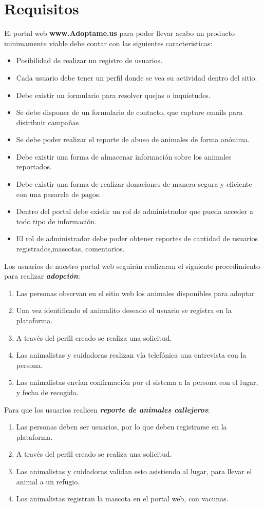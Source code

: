 \documentclass[paper=a4, fontsize=12pt]{article} 		%
\numberwithin{equation}{section}						%
\numberwithin{table}{section} 							%
\begin{document}
\section{Requisitos}
El portal web \textbf{www.Adoptame.us} para poder llevar acabo un producto minimamente viable debe contar con las siguientes caracteristicas:
\begin{itemize}
  \item Posibilidad de realizar un registro de usuarios. 
  \item Cada usuario debe tener un perfil donde se vea su actividad dentro del sitio.
  \item Debe existir un formulario  para resolver quejas o inquietudes. 
  \item Se debe disponer de un formulario de contacto, que capture emails para distribuir campañas. 
  \item Se debe poder realizar el reporte de abuso de animales de forma anónima. 
  \item Debe existir una forma de almacenar información sobre los animales reportados.
  \item Debe existir una forma de realizar donaciones de manera segura y eficiente con una pasarela de pagos.
  \item Dentro del portal debe existir un rol de administrador que pueda acceder a  todo tipo de información. 
  \item El rol de administrador debe poder obtener reportes de cantidad de usuarios registrados,mascotas, comentarios. 
\end{itemize}

Los usuarios de nuestro portal web seguirán realizaran el siguiente procedimiento para realizar \textit{\textbf{adopción}}:
\begin{enumerate}
\item Las personas observan en el sitio web los animales disponibles para adoptar
\item Una vez identificado el animalito deseado el usuario se registra en la plataforma. 
\item A través del perfil creado se realiza una solicitud.
\item Las animalistas y cuidadoras realizan vía telefónica una entrevista con la persona. 
\item Las animalistas envían confirmación por el sistema a la persona con el lugar, y 
fecha de recogida.
\end{enumerate}

Para que los usuarios realicen \textit{\textbf{reporte de animales callejeros}}:
\begin{enumerate}
\item Las personas deben ser usuarios, por lo que deben registrarse en la plataforma. 
\item A través del perfil creado se realiza una solicitud.
\item Las animalistas y cuidadoras validan esto asistiendo al lugar, para llevar el animal a un refugio. 
\item Los animalistas registran la mascota en el portal web, con vacunas. 
\end{enumerate}
\end{document}
